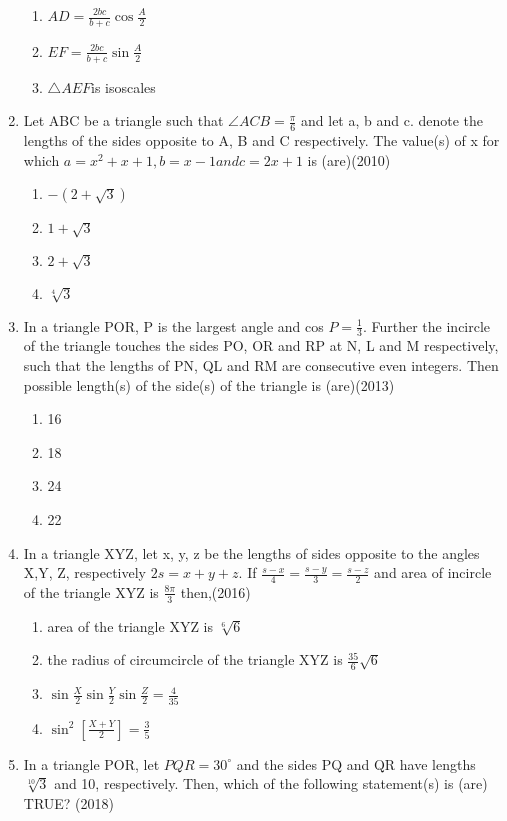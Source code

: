 \documentclass[12pt]{article}
\providecommand{\sbrak}[1]{\ensuremath{{}\left[#1\right]}}
\begin{document}
\begin{enumerate}
\begin{enumerate}
\item $AD=\frac{2bc}{b+c}\cos \frac{A}{2}$
\item $EF=\frac{2bc}{b+c}\sin \frac{A}{2}$
\item $\triangle AEF$is isoscales
\end{enumerate}
\item Let ABC be a triangle such that $\angle ACB=\frac{\pi}{6}$ and let a, b and c. denote the lengths of the sides opposite to A, B and C respectively. The value(s) of x for which $a=x^2+x+1,b=x-1 and c=2x+1$ is (are)(2010)
\begin{enumerate}
\item $-(2+\sqrt{3})$
\item $1+\sqrt{3}$
\item $2+\sqrt{3}$
\item $\sqrt[4]{3}$
\end{enumerate}
\item In a triangle POR, P is the largest angle and cos $P=\frac{1}{3}$. Further the incircle of the triangle touches the sides PO, OR and RP at N, L and M respectively, such that the lengths of PN, QL and RM are consecutive even integers. Then possible length(s) of the side(s) of the triangle is (are)(2013)
\begin{enumerate}
\item 16
\item 18
\item 24
\item 22
\end{enumerate}
\item In a triangle XYZ, let x, y, z be the lengths of sides opposite to the angles X,Y, Z, respectively $2s=x+y+z$. If $\frac{s-x}{4}=\frac{s-y}{3}=\frac{s-z}{2}$ and area of incircle of the triangle XYZ is $\frac{8\pi}{3}$ then,(2016)
\begin{enumerate}
\item area of the triangle XYZ is $\sqrt[6]{6}$
\item the radius of circumcircle of the triangle XYZ is $\frac{35}{6}\sqrt{6}$
\item $\sin\frac{X}{2}\sin\frac{Y}{2}\sin\frac{Z}{2}=\frac{4}{35}$
\item $\sin^2\sbrak{\frac{X+Y}{2}}=\frac{3}{5}$
\end{enumerate}
\item In a triangle POR, let $PQR=30^\circ$ and the sides PQ and QR have lengths $\sqrt[10]{3}$ and 10, respectively. Then, which of the following statement(s) is (are) TRUE? (2018)
\begin{enumerate}

\end{enumerate}
\end{enumerate}
\end{document}

